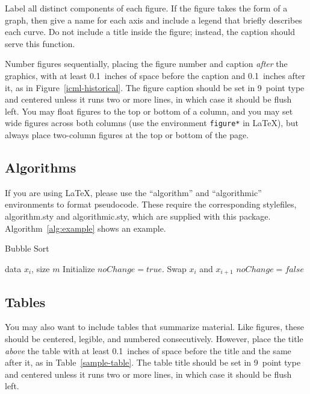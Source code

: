 \documentclass{article}
\begin{document}
Label all distinct components of each figure. If the figure takes the
form of a graph, then give a name for each axis and include a legend
that briefly describes each curve. Do not include a title inside the
figure; instead, the caption should serve this function.

Number figures sequentially, placing the figure number and caption
{\it after\/} the graphics, with at least 0.1~inches of space before
the caption and 0.1~inches after it, as in
Figure~\ref{icml-historical}.  The figure caption should be set in
9~point type and centered unless it runs two or more lines, in which
case it should be flush left.  You may float figures to the top or
bottom of a column, and you may set wide figures across both columns
(use the environment {\tt figure*} in \LaTeX), but always place
two-column figures at the top or bottom of the page.

\subsection{Algorithms}

If you are using \LaTeX, please use the ``algorithm'' and ``algorithmic'' 
environments to format pseudocode. These require 
the corresponding stylefiles, algorithm.sty and 
algorithmic.sty, which are supplied with this package. 
Algorithm~\ref{alg:example} shows an example. 

\begin{algorithm}[tb]
   \caption{Bubble Sort}
   \label{alg:example}
\begin{algorithmic}
    data $x_i$, size $m$
   \REPEAT
   \STATE Initialize $noChange = true$.
   \STATE Swap $x_i$ and $x_{i+1}$
   \STATE $noChange = false$
   \ENDIF
   \ENDFOR
\end{algorithmic}
\end{algorithm}
 
\subsection{Tables} 
 
You may also want to include tables that summarize material. Like 
figures, these should be centered, legible, and numbered consecutively. 
However, place the title {\it above\/} the table with at least 
0.1~inches of space before the title and the same after it, as in 
Table~\ref{sample-table}. The table title should be set in 9~point 
type and centered unless it runs two or more lines, in which case it
should be flush left.
\end{document}
